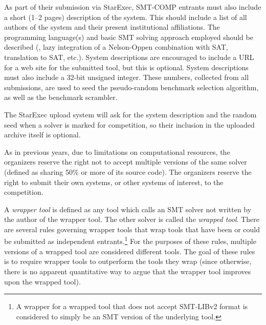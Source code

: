 \documentclass[12pt]{article}
\begin{document}
As part of their submission via StarExec,
SMT-COMP entrants must also include a short (1--2 pages) description of
the system.  This should include a list of all authors of the system
and their present institutional affiliations.  The programming
language(s) and basic SMT solving approach employed should be
described (\eg, lazy integration of a Nelson-Oppen combination with
SAT, translation to SAT, etc.).  System descriptions are encouraged to
include a URL for a web site for the submitted tool, but this is
optional.  System descriptions must also include a 32-bit unsigned
integer.  These numbers, collected from all submissions, are used
to seed the pseudo-random benchmark selection algorithm, as well
as the benchmark scrambler.

The StarExec upload system will ask for the system description and
the random seed when a solver is marked for competition, so
their inclusion in the uploaded archive itself is optional.

As in previous years, due to limitations on
computational resources, the organizers reserve the right not to
accept multiple versions of the same solver (defined as sharing 50\%
or more of its source code).  The organizers reserve the right to
submit their own systems, or other systems of interest, to the
competition.

A \emph{wrapper tool} is defined as any tool
which calls an SMT solver not written by the author of the wrapper
tool.  The other solver is called the \emph{wrapped tool}.  There are
several rules governing wrapper tools that wrap tools that have been or could be submitted as independent entrants.\footnote{A wrapper
for a wrapped tool that does not accept SMT-LIBv2 format is considered to simply be an SMT version of the underlying tool.}
For the purposes of these rules,
multiple versions of a wrapped tool are considered different tools.
The goal of these rules is to require wrapper tools to outperform the
tools they wrap (since otherwise, there is no apparent quantitative
way to argue that the wrapper tool improves upon the wrapped tool).
\end{document}

